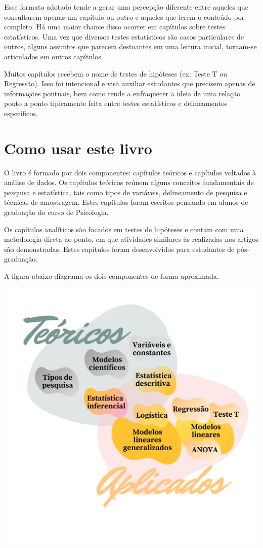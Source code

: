 \documentclass[
]{book}
\begin{document}
Esse formato adotado tende a gerar uma percepção diferente entre aqueles que consultarem apenas um capítulo ou outro e aqueles que lerem o conteúdo por completo. Há uma maior chance disso ocorrer em capítulos sobre testes estatísticos. Uma vez que diversos testes estatísticos são casos particulares de outros, alguns assuntos que parecem destoantes em uma leitura inicial, tornam-se articulados em outros capítulos.

Muitos capítulos recebem o nome de testes de hipóteses (ex: Teste T ou Regressão). Isso foi intencional e visa auxiliar estudantes que precisem apenas de informações pontuais, bem como tende a enfraquecer a ideia de uma relação ponto a ponto tipicamente feita entre testes estatísticos e delineamentos específicos.

\hypertarget{como-usar-este-livro}{%
\section{Como usar este livro}\label{como-usar-este-livro}}

O livro é formado por dois componentes: capítulos teóricos e capítulos voltados à análise de dados. Os capítulos teóricos reúnem alguns conceitos fundamentais de pesquisa e estatística, tais como tipos de variáveis, delineamento de pesquisa e técnicas de amostragem. Estes capítulos foram escritos pensando em alunos de graduação do curso de Psicologia.

Os capítulos analíticos são focados em testes de hipóteses e contam com uma metodologia direta ao ponto, em que atividades similares às realizadas nos artigos são demonstradas. Estes capítulos foram desenvolvidos para estudantes de pós-graduação.

A figura abaixo diagrama os dois componentes de forma aproximada.

\includegraphics{./img/proposta.png}
\end{document}

